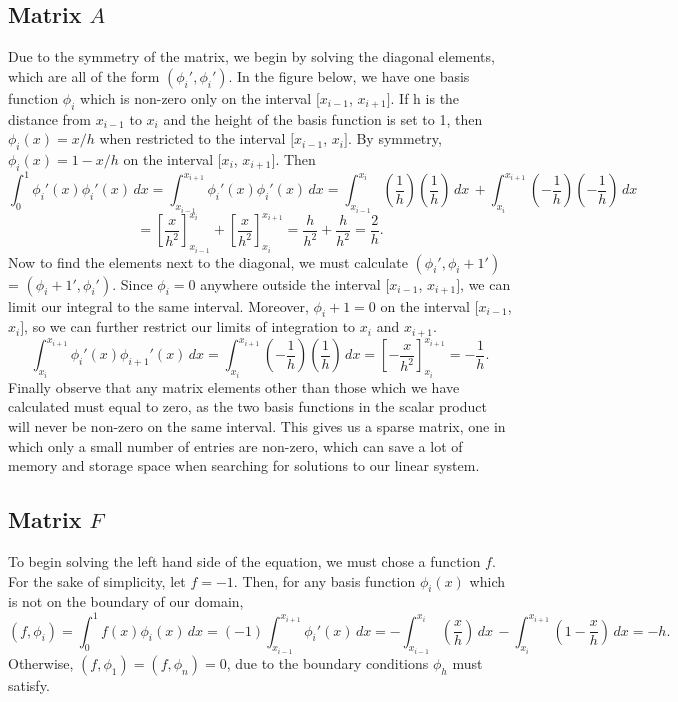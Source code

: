 \documentclass{article}
\begin{document}
\subsection{Matrix $A$}
Due to the symmetry of the matrix, we begin by solving the diagonal elements, which are all of the form $(\phi_i',\phi_i')$. In the figure below, we have one basis function $\phi_i$ which is non-zero only on the interval $[x_{i-1}$, $x_{i+1}]$. If h is the distance from $x_{i-1}$ to $x_{i}$ and the height of the basis function is set to 1, then $\phi_i(x) = x/h$ when restricted to the interval $[x_{i-1}$, $x_{i}]$. By symmetry, $\phi_i(x) = 1 - x/h$ on the interval $[x_{i}$, $x_{i+1}]$.  Then 
$$\int_{0}^{1} \phi_i'(x)\phi_i'(x) \,dx = \int_{x_{i-1}}^{x_{i+1}} \phi_i'(x)\phi_i'(x) \,dx = \int_{x_{i-1}}^{x_{i}} \left(\frac{1}{h}\right)\left(\frac{1}{h}\right)\,dx\, + \int_{x_{i}}^{x_{i+1}} \left(-\frac{1}{h}\right)\left(-\frac{1}{h}\right) \,dx $$ 
$$= \left[\frac{x}{h^2}\right]_{x_{i-1}}^{x_{i}} + \left[\frac{x}{h^2}\right]_{x_{i}}^{x_{i+1}} = \frac{h}{h^2} + \frac{h}{h^2} = \frac{2}{h}.$$ 
Now to find the elements next to the diagonal, we must calculate $(\phi_i',\phi_i+1')$ = $(\phi_i+1',\phi_i')$. Since $\phi_i = 0$ anywhere outside the interval $[x_{i-1}$, $x_{i+1}]$, we can limit our integral to the same interval. Moreover, $\phi_i+1 = 0$ on the interval $[x_{i-1}$, $x_{i}]$, so we can further restrict our limits of integration to $x_{i}$ and $x_{i+1}$. 
$$\int_{x_{i}}^{x_{i+1}} \phi_i'(x)\phi_{i+1}'(x) \,dx = \int_{x_{i}}^{x_{i+1}} \left(-\frac{1}{h}\right)\left(\frac{1}{h}\right)\,dx  = \left[-\frac{x}{h^2}\right]_{x_{i}}^{x_{i+1}} = -\frac{1}{h}.$$ 
Finally observe that any matrix elements other than those which we have calculated must equal to zero, as the two basis functions in the scalar product will never be non-zero on the same interval. This gives us a sparse matrix, one in which only a small number of entries are non-zero, which can save a lot of memory and storage space when searching for solutions to our linear system.  
\subsection{Matrix $F$}
To begin solving the left hand side of the equation, we must chose a function $f$. For the sake of simplicity, let $f = -1$. Then, for any basis function $\phi_i(x)$ which is not on the boundary of our domain, $$(f , \phi_i) = \int_{0}^{1} f(x)\phi_i(x) \,dx  = (- 1) \int_{x_{i-1}}^{x_{i+1}} \phi_i'(x) \,dx = - \int_{x_{i-1}}^{x_{i}} \left(\frac{x}{h}\right)\,dx\, - \int_{x_{i}}^{x_{i+1}} \left(1 -\frac{x}{h}\right) \,dx = - h.$$ 
Otherwise, $(f , \phi_1) = (f , \phi_n) = 0$, due to the boundary conditions $\phi_h$ must satisfy.
\end{document}
